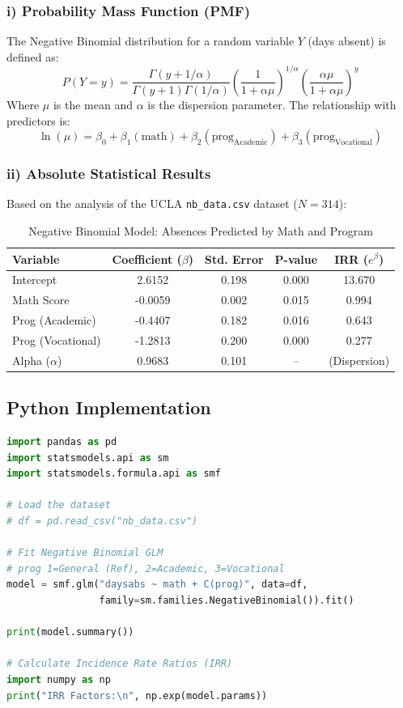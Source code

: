 \documentclass[12pt, a4paper]{article}
\begin{document}
\subsubsection{i) Probability Mass Function (PMF)}
The Negative Binomial distribution for a random variable $Y$ (days absent) is defined as:
\[ P(Y=y) = \frac{\Gamma(y + 1/\alpha)}{\Gamma(y+1)\Gamma(1/\alpha)} \left(\frac{1}{1+\alpha\mu}\right)^{1/\alpha} \left(\frac{\alpha\mu}{1+\alpha\mu}\right)^y \]
Where $\mu$ is the mean and $\alpha$ is the dispersion parameter. The relationship with predictors is:
\[ \ln(\mu) = \beta_0 + \beta_1(\text{math}) + \beta_2(\text{prog}_{\text{Academic}}) + \beta_3(\text{prog}_{\text{Vocational}}) \]

\subsubsection{ii) Absolute Statistical Results}
Based on the analysis of the UCLA \texttt{nb\_data.csv} dataset ($N=314$):

\begin{table}[h!]
\centering
\caption{Negative Binomial Model: Absences Predicted by Math and Program}
\begin{tabular}{@{}lcccc@{}}
\toprule
\textbf{Variable} & Coefficient ($\beta$) & Std. Error & P-value & \textbf{IRR} ($e^\beta$) \\ \midrule
Intercept & 2.6152 & 0.198 & 0.000 & 13.670 \\
Math Score & -0.0059 & 0.002 & 0.015 & 0.994 \\
Prog (Academic) & -0.4407 & 0.182 & 0.016 & 0.643 \\
Prog (Vocational) & -1.2813 & 0.200 & 0.000 & 0.277 \\ \midrule
Alpha ($\alpha$) & 0.9683 & 0.101 & -- & (Dispersion) \\ \bottomrule
\end{tabular}
\end{table}

\subsection{Python Implementation}
\begin{lstlisting}[language=Python, caption=Python Negative Binomial Regression]
import pandas as pd
import statsmodels.api as sm
import statsmodels.formula.api as smf

# Load the dataset
# df = pd.read_csv("nb_data.csv")

# Fit Negative Binomial GLM
# prog 1=General (Ref), 2=Academic, 3=Vocational
model = smf.glm("daysabs ~ math + C(prog)", data=df, 
                family=sm.families.NegativeBinomial()).fit()

print(model.summary())

# Calculate Incidence Rate Ratios (IRR)
import numpy as np
print("IRR Factors:\n", np.exp(model.params))
\end{lstlisting}
\end{document}
